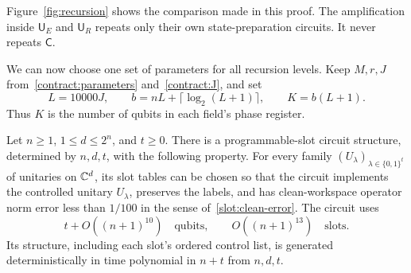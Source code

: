 Figure~\ref{fig:recursion} shows the comparison made in this proof.  The
amplification inside $\mathsf U_E$ and $\mathsf U_R$ repeats only their own
state-preparation circuits.  It never repeats $\mathsf C$.


We can now choose one set of parameters for all recursion levels.  Keep
$M,r,J$ from~\eqref{contract:parameters} and~\eqref{contract:J}, and set
\begin{equation}\label{rec:parameters}
 L=10000J,\qquad
 b=nL+\lceil\log_2(L+1)\rceil,\qquad
 K=b(L+1).
\end{equation}
Thus $K$ is the number of qubits in each field's phase register.

\begin{proposition}\label{rec:skeleton}
Let $n\geq1$, $1\leq d\leq2^n$, and $t\geq0$.  There is a programmable-slot
circuit structure, determined by $n,d,t$, with the following property.
For every family $(U_\lambda)_{\lambda\in\{0,1\}^t}$ of unitaries on
$\mathbb C^d$, its slot tables can be chosen so that the circuit implements the
controlled unitary $U_\lambda$, preserves the labels, and has clean-workspace
operator norm error less than $1/100$ in the sense of~\eqref{slot:clean-error}.
The circuit uses
\begin{equation}\label{rec:resources}
 t+O((n+1)^{10})\quad\text{qubits},
 \qquad O((n+1)^{13})\quad\text{slots}.
\end{equation}
Its structure, including each slot's ordered control list, is generated
deterministically in time polynomial in $n+t$ from $n,d,t$.
\end{proposition}

